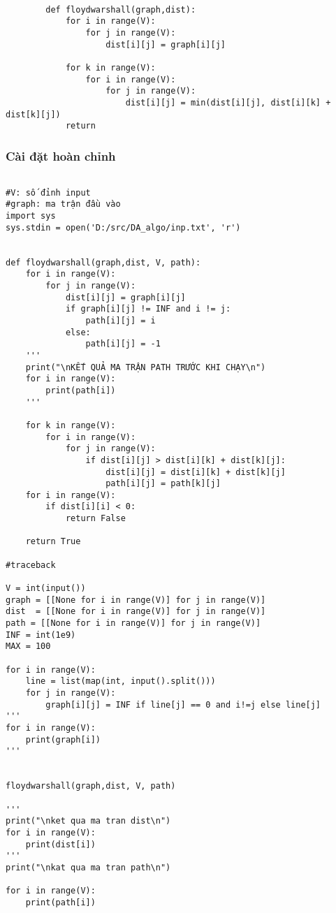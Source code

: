 \documentclass[a4paper]{article}
\begin{document}
\begin{mdframed}[hidealllines=true,backgroundcolor=magenta!10]
		\begin{lstlisting}
		
        def floydwarshall(graph,dist):
            for i in range(V):
                for j in range(V):
                    dist[i][j] = graph[i][j]
            
            for k in range(V):
                for i in range(V):
                    for j in range(V):
                        dist[i][j] = min(dist[i][j], dist[i][k] + dist[k][j])
            return 
		\end{lstlisting}
	\end{mdframed}
\subsubsection{Cài đặt hoàn chỉnh}
\begin{mdframed}[hidealllines=true,backgroundcolor=magenta!10]
		\begin{lstlisting}

#V: số đỉnh input
#graph: ma trận đầu vào
import sys
sys.stdin = open('D:/src/DA_algo/inp.txt', 'r')


def floydwarshall(graph,dist, V, path):
    for i in range(V):
        for j in range(V):
            dist[i][j] = graph[i][j]
            if graph[i][j] != INF and i != j:
                path[i][j] = i
            else:
                path[i][j] = -1
    '''
    print("\nKẾT QUẢ MA TRẬN PATH TRƯỚC KHI CHẠY\n")
    for i in range(V):
        print(path[i])
    '''

    for k in range(V):
        for i in range(V):
            for j in range(V):
                if dist[i][j] > dist[i][k] + dist[k][j]:
                    dist[i][j] = dist[i][k] + dist[k][j]
                    path[i][j] = path[k][j]
    for i in range(V):
        if dist[i][i] < 0:
            return False
        
    return True 

#traceback

V = int(input())
graph = [[None for i in range(V)] for j in range(V)]
dist  = [[None for i in range(V)] for j in range(V)]
path = [[None for i in range(V)] for j in range(V)]
INF = int(1e9)
MAX = 100

for i in range(V):
    line = list(map(int, input().split()))
    for j in range(V):
        graph[i][j] = INF if line[j] == 0 and i!=j else line[j]
'''
for i in range(V):
    print(graph[i])
'''


floydwarshall(graph,dist, V, path)

'''
print("\nket qua ma tran dist\n")
for i in range(V):
    print(dist[i])
'''
print("\nkat qua ma tran path\n")

for i in range(V):
    print(path[i])

		\end{lstlisting}
	\end{mdframed}
\end{document}

